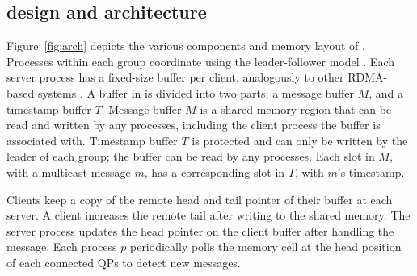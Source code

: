 \subsection{\libname design and architecture}
\label{sec:overview}

Figure~\ref{fig:arch} depicts the various components and memory layout of \libname.
Processes within each group coordinate using the leader-follower model \cite{gotsman2019white,Junqueira2011,Mu,delta4}.
Each server process has a fixed-size buffer per client, analogously to other RDMA-based systems \cite{FaRM, Mu, DARE, APUS}.
A buffer in \libname is divided into two parts, a message buffer $M$, and a timestamp buffer $T$.
Message buffer $M$ is a shared memory region that can be read and written by any processes, including the client process the buffer is associated with.
Timestamp buffer $T$ is protected and can only be written by the leader of each group; the buffer can be read by any processes.
Each slot in $M$, with a multicast message $m$, has a corresponding slot in $T$, with $m$'s timestamp.


Clients keep a copy of the remote head and tail pointer of their buffer at each server. 
A client increases the remote tail after writing to the shared memory. 
The server process updates the head pointer on the client buffer after handling the message.
Each process $p$ periodically polls the memory cell at the head position of each
connected QPs to detect new messages.




